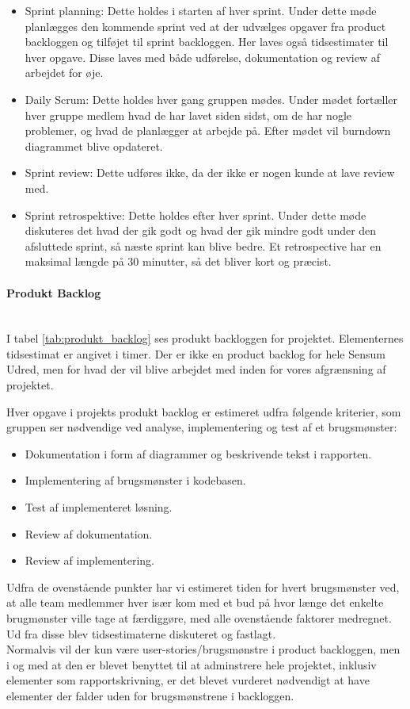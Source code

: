 \documentclass[../../main.tex]{subfiles}
\begin{document}
\begin{itemize}
\item Sprint planning: Dette holdes i starten af hver sprint. Under dette møde planlægges den kommende sprint ved at der udvælges opgaver fra product backloggen og tilføjet til sprint backloggen. Her laves også tidsestimater til hver opgave. Disse laves med både udførelse, dokumentation og review af arbejdet for øje.
\item Daily Scrum: Dette holdes hver gang gruppen mødes. Under mødet fortæller hver gruppe medlem hvad de har lavet siden sidst, om de har nogle problemer, og hvad de planlægger at arbejde på. Efter mødet vil burndown diagrammet blive opdateret.
\item Sprint review: Dette udføres ikke, da der ikke er nogen kunde at lave review med.
\item Sprint retrospektive: Dette holdes efter hver sprint. Under dette møde diskuteres det hvad der gik godt og hvad der gik mindre godt under den afsluttede sprint, så næste sprint kan blive bedre. Et retrospective har en maksimal længde på 30 minutter, så det bliver kort og præcist.
\end{itemize}

\paragraph{Produkt Backlog}\mbox{}\\
I tabel \ref{tab:produkt_backlog} ses produkt backloggen for projektet. Elementernes tidsestimat er angivet i timer. Der er ikke en product backlog for hele Sensum Udred, men for hvad der vil blive arbejdet med inden for vores afgrænsning af projektet. 


Hver opgave i projekts produkt backlog er estimeret udfra følgende kriterier, som gruppen ser nødvendige ved analyse, implementering og test af et brugsmønster: 
\begin{itemize}
	\item Dokumentation i form af diagrammer og beskrivende tekst i rapporten.
    \item Implementering af brugsmønster i kodebasen.
    \item Test af implementeret løsning.
    \item Review af dokumentation.
    \item Review af implementering.
\end{itemize}
Udfra de ovenstående punkter har vi estimeret tiden for hvert brugsmønster ved, at alle team medlemmer hver især kom med et bud på hvor længe det enkelte brugmønster ville tage at færdiggøre, med alle ovenstående faktorer medregnet. Ud fra disse blev tidsestimaterne diskuteret og fastlagt.\\ 
Normalvis vil der kun være user-stories/brugsmønstre i product backloggen, men i og med at den er blevet benyttet til at adminstrere hele projektet, inklusiv elementer som rapportskrivning, er det blevet vurderet nødvendigt at have elementer der falder uden for brugsmønstrene i backloggen.   
\end{document}
